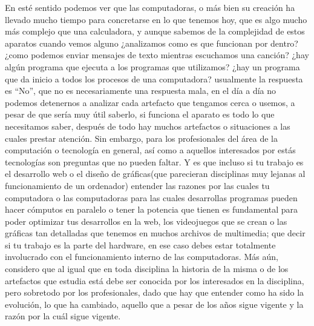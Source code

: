 \documentclass[letterpaper,12pt,oneside]{book}
\begin{document}
	En esté sentido podemos ver que las computadoras, o más bien su creación ha llevado mucho tiempo para concretarse en lo que tenemos hoy, que es algo mucho
	más complejo que una calculadora, y aunque sabemos de la complejidad de estos aparatos cuando vemos alguno ¿analizamos como es que funcionan por dentro? ¿como podemos enviar mensajes de texto mientras escuchamos una canción? ¿hay algún programa que ejecuta a los programas que utilizamos? ¿hay un programa que da inicio a todos los procesos de una computadora?
	usualmente la respuesta es ``No'', que no es necesariamente una respuesta mala, en el día a día no podemos detenernos a analizar cada artefacto que tengamos cerca o usemos, a pesar de que sería muy útil saberlo,
	si funciona el aparato es todo lo que necesitamos saber, después de todo hay muchos artefactos o situaciones
	a las cuales prestar atención. Sin embargo, para los profesionales del área de la computación o tecnología en general, así como a aquellos interesados
	por estás tecnologías son preguntas que no pueden faltar. Y es que incluso si tu trabajo es el desarrollo web o
	el diseño de gráficas(que parecieran disciplinas muy lejanas al funcionamiento de un ordenador) entender las razones por las cuales tu computadora o las computadoras para las cuales desarrollas programas pueden hacer cómputos
	en paralelo o tener la potencia que tienen es fundamental para poder optimizar tus desarrollos en la web, los videojuegos que se crean o las gráficas tan detalladas que tenemos en muchos archivos de multimedia; que decir si tu trabajo es la parte del hardware, en ese
	caso debes estar totalmente involucrado con el funcionamiento interno de las computadoras.
	Más aún, considero que al igual que en toda disciplina la historia de la misma o de los artefactos que estudia está debe ser conocida por
	los interesados en la disciplina, pero sobretodo por los profesionales, dado que hay que entender como ha sido la evolución, lo que ha cambiado,
	aquello que a pesar de los años sigue vigente y la razón por la cuál sigue vigente.
	
\end{document}
